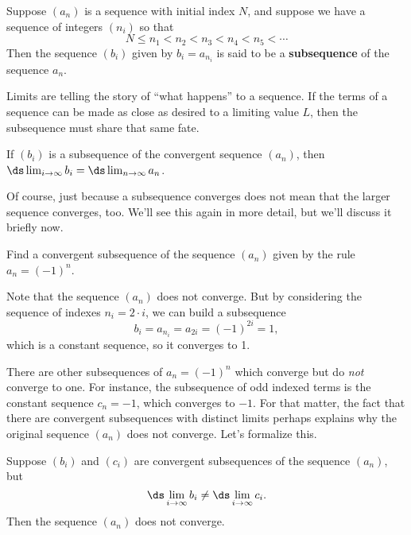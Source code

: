 \documentclass{ximera}
\newcommand{\defnword}[1]{\textbf{#1}}
\renewcommand{\index}[1]{}
\begin{document}
\begin{definition}
  Suppose $(a_n)$ is a sequence with initial index $N$, and suppose we have a sequence of integers $(n_i)$ so that
  $$
  N \leq n_1 < n_2 < n_3 < n_4 < n_5 < \cdots 
  $$
  Then the sequence $(b_i)$ given by $b_i = a_{n_i}$ is said to be a \defnword{subsequence}\index{sequence!subsequence}\index{subsequence}
  of the sequence $a_n$.
\end{definition}


Limits are telling the story of ``what happens'' to a sequence.  If
the terms of a sequence can be made as close as desired to a limiting
value $L$, then the subsequence must share that same fate.

\begin{theorem}
  \label{theorem:subsequence-same-limit}
  If $(b_i)$ is a subsequence of the convergent sequence $(a_n)$, then
  $\ds\lim_{i \to \infty} b_i = \ds\lim_{n \to \infty} a_n$.
\end{theorem}

Of course, just because a subsequence converges does not mean that the
larger sequence converges, too.  We'll see this again in more detail,
but we'll discuss it briefly now.

\begin{example}
Find a convergent subsequence of the sequence $(a_n)$ given by the rule $a_n = (-1)^n$.
\end{example}

\begin{solution}
Note that the sequence $(a_n)$ does not converge.  But by considering the sequence of indexes $n_i = 2 \cdot i$, we can build a subsequence
$$
b_i = a_{n_i} = a_{2i} = (-1)^{2i} = 1,
$$
which is a constant sequence, so it converges to 1.
\end{solution}

There are other subsequences of $a_n = (-1)^n$ which converge but do
\textit{not} converge to one.  For instance, the subsequence of odd
indexed terms is the constant sequence $c_n = -1$, which converges to
$-1$.  For that matter, the fact that there are convergent
subsequences with distinct limits perhaps explains why the original
sequence $(a_n)$ does not converge.  Let's formalize this.

\begin{corollary}
  \label{corollary:different-subsequences-then-diverge}

  Suppose $(b_i)$ and $(c_i)$ are convergent subsequences of the sequence $(a_n)$, but
  $$
  \ds\lim_{i \to \infty} b_i \neq \ds\lim_{i \to \infty} c_i.
  $$
  Then the sequence $(a_n)$ does not converge.
\end{corollary}
\end{document}

